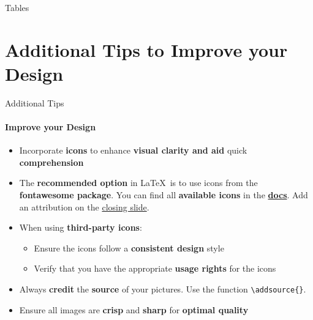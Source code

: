 \documentclass[aspectratio=169]{beamer}
\begin{document}
\begin{frame}{Tables}
    
\end{frame}


\section{Additional \textbf{Tips} to Improve your Design}

\begin{frame}
    \agenda     
\end{frame}

\begin{frame}{Additional Tips}
    \framesubtitle{Improve your Design}

    \begin{coloredblock}
        \begin{itemize}
            \item Incorporate \textbf{icons} to enhance \textbf{visual clarity and aid }quick \textbf{comprehension}
            \item The \textbf{recommended option} in \LaTeX~is to use icons from the \textbf{fontawesome package}. You can find all \textbf{available icons} in the \href{https://mirror.easyname.at/ctan/fonts/fontawesome7/doc/fontawesome7.pdf}{\textbf{docs}}. Add an attribution on the \hyperlink{frame:closing_slide}{closing slide}.

            \item When using \textbf{third-party icons}:
            \vspace{-0.5\topsep}
            \begin{itemize}
                \item Ensure the icons follow a \textbf{consistent design} style
                \item Verify that you have the appropriate \textbf{usage rights} for the icons
            \end{itemize}
        \end{itemize}
    \end{coloredblock}

        \begin{coloredblock}
            \begin{itemize}
                \item Always \textbf{credit} the \textbf{source} of your pictures. Use the function \texttt{\textbackslash addsource\{\}}.
                \item Ensure all images are \textbf{crisp} and \textbf{sharp} for \textbf{optimal quality}
            \end{itemize}
        \end{coloredblock}
\end{frame}
\end{document}
